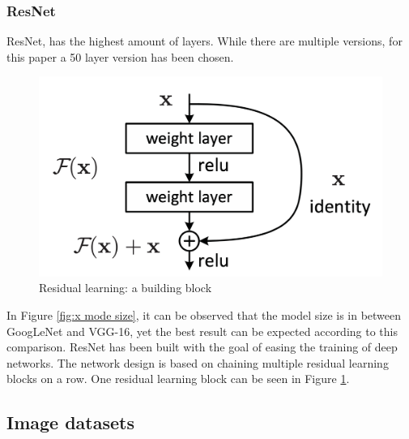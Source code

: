 \documentclass[conference]{IEEEtran}
\begin{document}
\subsubsection{ResNet}
ResNet, has the highest amount of layers. While there are multiple versions, for this paper a 50 layer version has been chosen.
\begin{figure}[!htbp]
    \centering
    \includegraphics[scale=0.2]{img/residual block.png}
    \caption{Residual learning: a building block \cite{he_deep_2015}}
    \label{fig:x resblock}
\end{figure}
In Figure \ref{fig:x mode size}, it can be observed that the model size is in between GoogLeNet and VGG-16, yet the best result can be expected according to this comparison.
ResNet has been built with the goal of easing the training of deep networks. The network design is based on chaining multiple residual learning blocks on a row. One residual learning block can be seen in Figure \ref{fig:x resblock}. \cite{he_deep_2015}


\subsection{Image datasets}
\end{document}
